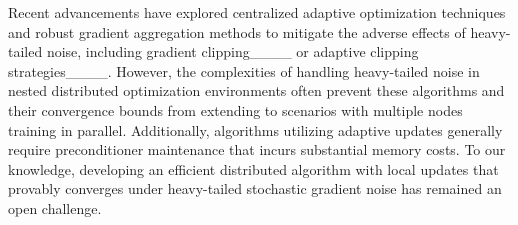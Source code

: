 Recent advancements have explored centralized adaptive optimization techniques and robust gradient aggregation methods to mitigate the adverse effects of heavy-tailed noise, including gradient clipping____ or adaptive clipping strategies____. 
However, the complexities of handling heavy-tailed noise in nested distributed optimization environments often prevent these algorithms and their convergence bounds from extending to scenarios with multiple nodes training in parallel. %
Additionally, algorithms utilizing adaptive updates generally require preconditioner maintenance that incurs substantial memory costs.
To our knowledge, developing an efficient  distributed algorithm with local updates that provably converges under heavy-tailed stochastic gradient noise %
has remained an open challenge. %
